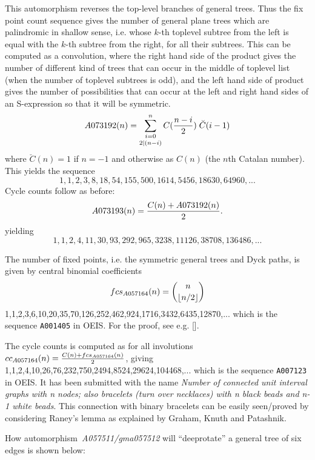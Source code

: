 \documentclass[11pt]{article} %
\newcommand{\eeq}{\end{equation}}
\newcommand{\beql}[1]{\begin{equation}\label{#1}}
\def\sratio#1#2{{#1/#2}}
\def\oratio#1#2{{#1\over #2}}
\newcommand{\autname}[1]{{\it *#1}}
\newcommand{\automorphism}[1]{automorphism~\autname{#1}}
\newcommand{\EISseq}[1]{{\tt #1}}
\begin{document}


This automorphism reverses the top-level branches of general trees.
Thus the fix point count sequence gives the number of general plane trees
which are palindromic in shallow sense, i.e. whose $k$-th toplevel subtree from
the left is equal with the $k$-th subtree from the right, for all their subtrees.
This can be computed as a 
convolution, where the right hand side of the product gives
the number of different kind of trees that can occur in the middle of
toplevel list (when the number of toplevel subtrees is odd),
and the left hand side of product gives the number of possibilities
that can occur at the left and right hand sides of an S-expression
so that it will be symmetric.
\beql{Eqfc_A057508}
\aligned
A073192(n) = \mathop{\sum_{i=0}^{n}}_{2|(n-i)} C(\oratio{n-i}{2})\;{\breve C}(i-1)
\endaligned
\eeq
where ${\breve C}(n)=1$ if $n=-1$ and otherwise as $C(n)$ (the $n$th Catalan number).
This yields the sequence
$$
1,1,2,3,8,18,54,155,500,1614,5456,18630,64960,...
$$
Cycle counts follow as before:
\beql{Eqcc_A057508}
\aligned
A073193(n) = \oratio{C(n)+A073192(n)}{2}.
\endaligned
\eeq
yielding
$$
1,1,2,4,11,30,93,292,965,3238,11126,38708,136486,...
$$



The number of fixed points, i.e. the symmetric general trees and Dyck
paths, is given by central binomial coefficients
\beql{EQfc_A057164}
\aligned
fcs_{A057164}(n) = {n\choose \lfloor \sratio{n}{2}\rfloor}
\endaligned
\eeq
1,1,2,3,6,10,20,35,70,126,252,462,924,1716,3432,6435,12870,...
which is the sequence \EISseq{A001405} in OEIS.
For the proof, see e.g. [].

The cycle counts is computed as for all involutions
$cc_{A057164}(n) = \oratio{C(n)+fcs_{A057164}(n)}{2}$,
giving 1,1,2,4,10,26,76,232,750,2494,8524,29624,104468,...
which is the sequence \EISseq{A007123} in OEIS.
It has been submitted with the name
{\em Number of connected unit interval graphs with n nodes;
also bracelets (turn over necklaces) with n black beads and n-1 white
beads}.
This connection with binary bracelets can be easily seen/proved by
considering Raney's lemma as explained by Graham, Knuth and Patashnik.




How \automorphism{A057511/gma057512} will ``deeprotate'' a general
tree of six edges is shown below:
\end{document}
